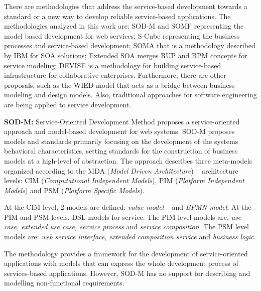 There are methodologies that address the service-based development towards a
standard or a new way to develop reliable service-based applications. The
methodologies analyzed in this work are: SOD-M \cite{valeriaThesis} and SOMF
\cite{somf} representing the model based development for web services; S-Cube
\cite{scube2010book} representing the business processes and service-based
development; SOMA \cite{soma} that is a methodology described by IBM
for SOA solutions; Extended SOA \cite{PapazoglouH06} merges RUP\cite{rup} and
BPM\cite{bpm} concepts for service modeling; DEVISE \cite{DEVISE} is a
methodology for building service-based infrastructure for collaborative
enterprises. Furthermore, there are other proposals, such as the WIED
model \cite{TongrungrojanaL04} that acts as a bridge between business modeling and
design models. Also, traditional approaches for software engineering
\cite{sommerville08} are being applied to service development.

\bigskip

\textbf{SOD-M:} Service-Oriented Development Method \cite{CastroMV11}
proposes a service-oriented approach and model-based development for web systems.
SOD-M proposes models and standards primarily focusing on the
development of the systems behavioral characteristics, setting standards for
the construction of business models at a high-level of abstraction. The approach
describes three  meta-models organized according to the MDA (\textit{Model
Driven Architecture}) ~\cite{miller} architecture levels: CIM (\textit{Computational
Independent Models}), PIM (\textit{Platform Independent Models}) and PSM
(\textit{Platform Specific Models}).

At the CIM level, 2 models are defined: \textit{value model}
~\cite{Gordijn02valuebased} and \textit{BPMN model};
At the PIM and PSM levels, DSL models for service. The
PIM-level models are: \textit{use case, extended use case, service process} and
\textit{service composition}. The PSM level models are: \textit{web
service interface}, \textit{extended composition service} and \textit{business
logic}. 


The methodology provides a framework for the development of
service-oriented applications with models that can express the whole
development process of services-based applications. However, SOD-M
has no support for describing and modelling non-functional requirements. 



